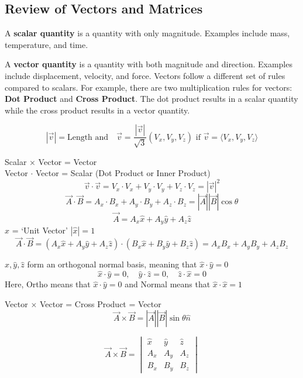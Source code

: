 \documentclass[11pt]{article}
\begin{document}
\subsection{Review of Vectors and Matrices}
\begin{definition}
    A \textbf{scalar quantity} is a quantity with only magnitude. Examples include mass, temperature, and time.
\end{definition}

\begin{definition}
    A \textbf{vector quantity} is a quantity with both magnitude and direction. Examples include displacement, velocity, and force. Vectors follow a different set of rules compared to scalars. For example, there are two multiplication rules for vectors: \textbf{Dot Product} and \textbf{Cross Product}. The dot product results in a scalar quantity while the cross product results in a vector quantity.

    \[
        |\vec{v}| = \text{Length and} \quad \vec{v} = \frac{|\vec{v}|}{\sqrt{3}}(V_x, V_y, V_z) \text{ if } \vec{v} = \langle V_x, V_y, V_z \rangle
    \]

    Scalar \(\times\) Vector = Vector \\
    Vector \(\cdot\) Vector = Scalar (Dot Product or Inner Product) \\
    \[
        \vec{v} \cdot \vec{v} = V_x \cdot V_x + V_y \cdot V_y + V_z \cdot V_z = |\vec{v}|^2
    \]
    \[
        \vec{A} \cdot \vec{B} = A_x \cdot B_x + A_y \cdot B_y + A_z \cdot B_z = |\vec{A}| |\vec{B}| \cos \theta
    \]
    \[
        \vec{A} = A_x \hat{x} + A_y \hat{y} + A_z \hat{z}
    \]
    \(\hat{x}\) = `Unit Vector' \(|\hat{x}| = 1\)
    \[
        \vec{A} \cdot \vec{B} = (A_x \hat{x} + A_y \hat{y} + A_z \hat{z}) \cdot (B_x \hat{x} + B_y \hat{y} + B_z \hat{z}) = A_x B_x + A_y B_y + A_z B_z
    \]

    \(\hat{x}, \hat{y}, \hat{z}\) form an orthogonal normal basis, meaning that \(\hat{x} \cdot \hat{y} = 0\)
    \[
        \hat{x} \cdot \hat{y} = 0, \quad \hat{y} \cdot \hat{z} = 0, \quad \hat{z} \cdot \hat{x} = 0
    \]
    Here, Ortho means that \(\hat{x} \cdot \hat{y} = 0\) and Normal means that \(\hat{x} \cdot \hat{x} = 1\)
\end{definition}

Vector \(\times\) Vector = Cross Product = Vector
\[
    \vec{A} \times \vec{B} = |\vec{A}| |\vec{B}| \sin \theta \hat{n}
\]

\[
    \vec{A} \times \vec{B} = \begin{vmatrix}
        \hat{x} & \hat{y} & \hat{z} \\
        A_x     & A_y     & A_z     \\
        B_x     & B_y     & B_z
    \end{vmatrix}
\]
\end{document}
